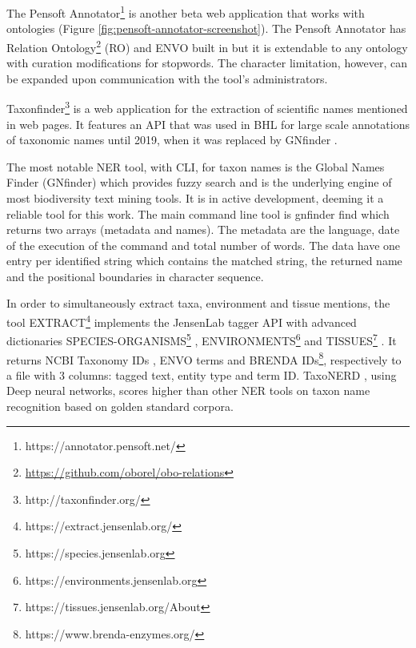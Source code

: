The Pensoft Annotator\footnote{https://annotator.pensoft.net/} is another beta
web application that works with ontologies \parencite{dimitrova_pensoft_2020}
(Figure \ref{fig:pensoft-annotator-screenshot}). The Pensoft Annotator has Relation
Ontology\footnote{\url{https://github.com/oborel/obo-relations}} (RO) and ENVO
built in but it is extendable to any ontology with curation modifications for
stopwords. The character limitation, however, can be expanded upon
communication with the tool’s administrators.

Taxonfinder\footnote{http://taxonfinder.org/} is a web application for the
extraction of scientific names mentioned in web pages. It features an API that
was used in BHL for large scale annotations of taxonomic names until 2019,
when it was replaced by GNfinder \parencite{richard_improving_2020}.

The most notable NER tool, with CLI, for taxon names is the Global Names Finder
(GNfinder) \parencite{pyle_towards_2016,mozzherin_gnamesgnfinder_2022} which
provides fuzzy search and is the underlying engine of most biodiversity text
mining tools. It is in active development, deeming it a reliable tool for this
work. The main command line tool is gnfinder find which returns two arrays
(metadata and names). The metadata are the language, date of the execution of
the command and total number of words. The data have one entry per identified
string which contains the matched string, the returned name and the positional
boundaries in character sequence.

In order to simultaneously extract taxa, environment and tissue mentions, the
tool EXTRACT\footnote{https://extract.jensenlab.org/} \parencite{pafilis_extract_2017}
implements the JensenLab tagger API \parencite{jensen2016one} with advanced
dictionaries SPECIES-ORGANISMS\footnote{https://species.jensenlab.org} \parencite{pafilis_species_2013},
ENVIRONMENTS\footnote{https://environments.jensenlab.org}
\parencite{pafilis_environments_2015} and TISSUES\footnote{https://tissues.jensenlab.org/About}
\parencite{palasca_tissues_2018}. It returns NCBI Taxonomy IDs \parencite{schoch2020ncbi},
ENVO terms and BRENDA IDs\footnote{https://www.brenda-enzymes.org/},
respectively to a file with 3 columns: tagged text, entity type and term ID.
TaxoNERD \parencite{le_guillarme_taxonerd_2022}, using Deep neural networks, scores
higher than other NER tools on taxon name recognition based on golden standard
corpora.

